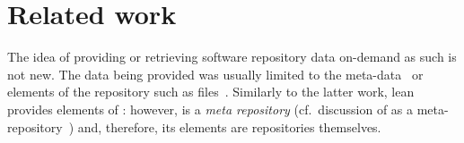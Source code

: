 
\section{Related work}
\label{sec:relwork}

The idea of providing or retrieving software repository data on-demand as such is not new. The data being provided was
usually limited to the meta-data~\cite{Codebook} or elements of the repository such as files~\cite{Voinea2006Mining}. Similarly to the latter work, lean \ght provides elements of \gh: however, \gh is a \emph{meta repository}  (cf.\ discussion of \ohloh as a meta-repository~\cite{Gruhn2013Security}) and, therefore, its elements are repositories themselves. 